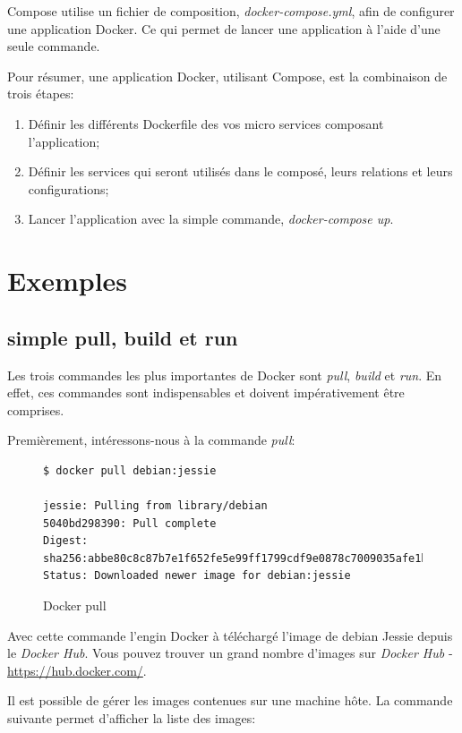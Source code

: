 Compose utilise un fichier de composition, \emph{docker-compose.yml}, afin de configurer une application Docker. Ce qui permet de lancer une application à l'aide d'une seule commande. 

Pour résumer, une application Docker, utilisant Compose, est la combinaison de trois étapes:

\begin{enumerate}
\item Définir les différents Dockerfile des vos micro services composant l'application;
\item Définir les services qui seront utilisés dans le composé, leurs relations et leurs configurations;
\item Lancer l'application avec la simple commande, \emph{docker-compose up}.
\end{enumerate}

\section{Exemples}
\subsection{simple pull, build et run}
Les trois commandes les plus importantes de Docker sont \emph{pull}, \emph{build} et \emph{run}. En effet, ces commandes sont indispensables et doivent impérativement être comprises.

Premièrement, intéressons-nous à la commande \emph{pull}:

\begin{figure}[H] 
\centering 
\begin{lstlisting}[frame=single]
$ docker pull debian:jessie

jessie: Pulling from library/debian
5040bd298390: Pull complete 
Digest: sha256:abbe80c8c87b7e1f652fe5e99ff1799cdf9e0878c7009035afe1bccac129cad8
Status: Downloaded newer image for debian:jessie
\end{lstlisting}
\caption[Code - Docker pull]{Docker pull}
\label{fig:dockerPull} 
\end{figure}

Avec cette commande l'engin Docker à téléchargé l'image de debian Jessie depuis le \emph{Docker Hub}. Vous pouvez trouver un grand nombre d'images sur \emph{Docker Hub} - \hyperref[Docker Hub]{https://hub.docker.com/}.

Il est possible de gérer les images contenues sur une machine hôte. La commande suivante permet d'afficher la liste des images:

